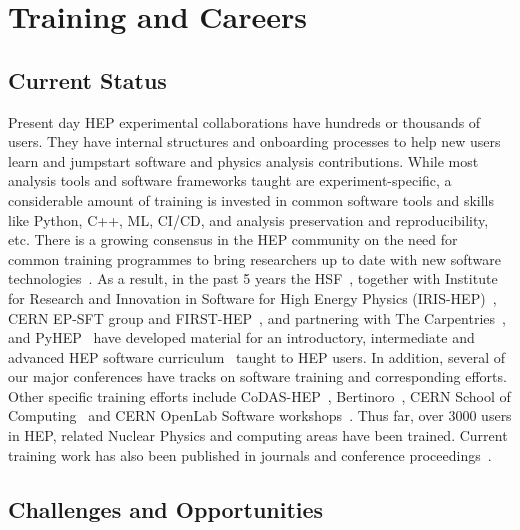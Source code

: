 \documentclass[10pt,a4paper]{article}
\begin{document}
\section{Training and Careers}\label{training-and-careers}

\subsection{Current Status}\label{current-status}

Present day HEP experimental collaborations have hundreds or thousands of users.
They have internal structures and onboarding processes to help new users learn
and jumpstart software and physics analysis contributions. While most analysis
tools and software frameworks taught are experiment-specific, a considerable
amount of training is invested in common software tools and skills like Python,
C++, ML, CI/CD, and analysis preservation and reproducibility, etc. There is a
growing consensus in the HEP community on the need for common training programmes
to bring researchers up to date with new software
technologies~\cite{HSF-CWP-2017-02, Snowmass:2021_community_engagement_frontier, Snowmass:2021_CEF_report, Snowmass:2021_career_pipeline}.
As a result, in the past 5 years the HSF~\cite{HSFTraining}, together with Institute for
Research and Innovation in Software for High Energy Physics (IRIS-HEP)~\cite{IRISHEP:Training},
CERN EP-SFT group and FIRST-HEP~\cite{FIRST-HEP}, and partnering with The
Carpentries~\cite{TheCarpentries}, and PyHEP~\cite{HSFPyHEP} have developed material for an
introductory, intermediate and advanced HEP software curriculum~\cite{HSFTrainingCenter} taught
to HEP users. In addition, several of our major conferences have tracks on
software training and corresponding efforts. Other specific training efforts
include CoDAS-HEP~\cite{CODAS-HEP}, Bertinoro~\cite{INFN:ESC_school}, CERN School of
Computing~\cite{CERN:computing_school} and CERN OpenLab Software
workshops~\cite{CERN:SW_workshops}. Thus far,
over 3000 users in HEP, related Nuclear Physics and computing areas have been
trained. Current training work has also been published in journals and
conference proceedings~\cite{Malik:2919564, Malik:chep2023_training_outreach, Malik2021Software, 10.3389/fdata.2025.1497622}.

\subsection{Challenges and
Opportunities}\label{challenges-and-opportunities}
\end{document}
